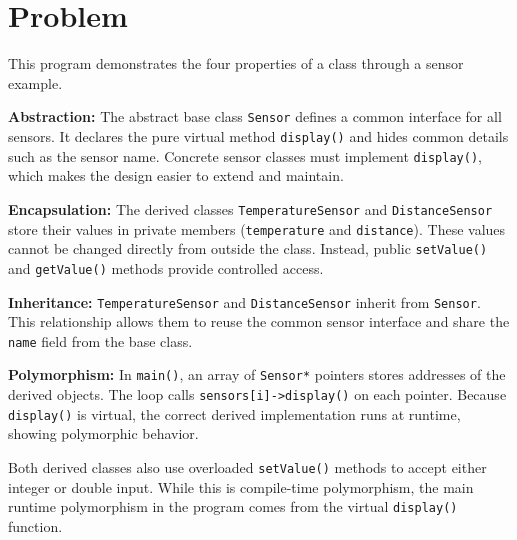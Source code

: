 \section{Problem}

This program demonstrates the four properties of a class through a sensor example.

\textbf{Abstraction:} The abstract base class \texttt{Sensor} defines a common interface for all sensors. It declares the pure virtual method \texttt{display()} and hides common details such as the sensor name. Concrete sensor classes must implement \texttt{display()}, which makes the design easier to extend and maintain.

\textbf{Encapsulation:} The derived classes \texttt{TemperatureSensor} and \texttt{DistanceSensor} store their values in private members (\texttt{temperature} and \texttt{distance}). These values cannot be changed directly from outside the class. Instead, public \texttt{setValue()} and \texttt{getValue()} methods provide controlled access.

\textbf{Inheritance:} \texttt{TemperatureSensor} and \texttt{DistanceSensor} inherit from \texttt{Sensor}. This relationship allows them to reuse the common sensor interface and share the \texttt{name} field from the base class.

\textbf{Polymorphism:} In \texttt{main()}, an array of \texttt{Sensor*} pointers stores addresses of the derived objects. The loop calls \texttt{sensors[i]->display()} on each pointer. Because \texttt{display()} is virtual, the correct derived implementation runs at runtime, showing polymorphic behavior.

Both derived classes also use overloaded \texttt{setValue()} methods to accept either integer or double input. While this is compile-time polymorphism, the main runtime polymorphism in the program comes from the virtual \texttt{display()} function.

